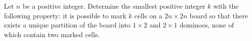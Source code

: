 Let 
$n$
 be a positive integer. Determine the smallest positive integer 
$k$
 with the following property: it is possible to mark 
$k$
 cells on a 
$2n \times 2n$
 board so that there exists a unique partition of the board into 
$1 \times 2$
 and 
$2 \times 1$
 dominoes, none of which contain two marked cells.